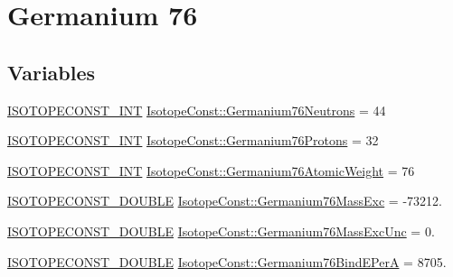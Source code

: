 \hypertarget{group___isotope_const-_germanium-_ge76}{}\section{Germanium 76}
\label{group___isotope_const-_germanium-_ge76}
\subsection*{Variables}
\begin{DoxyCompactItemize}
\item 
\mbox{\hyperlink{group___isotope_const-_macros_ga5f18360b3e99483a35c32d789e62621c}{I\+S\+O\+T\+O\+P\+E\+C\+O\+N\+S\+T\+\_\+\+I\+NT}} \mbox{\hyperlink{group___isotope_const-_germanium-_ge76_ga0f41cf80072dd6011f30625a9f236fae}{Isotope\+Const\+::\+Germanium76\+Neutrons}} = 44
\item 
\mbox{\hyperlink{group___isotope_const-_macros_ga5f18360b3e99483a35c32d789e62621c}{I\+S\+O\+T\+O\+P\+E\+C\+O\+N\+S\+T\+\_\+\+I\+NT}} \mbox{\hyperlink{group___isotope_const-_germanium-_ge76_ga7f76b6003a0a6a6c932be69e5c448bdf}{Isotope\+Const\+::\+Germanium76\+Protons}} = 32
\item 
\mbox{\hyperlink{group___isotope_const-_macros_ga5f18360b3e99483a35c32d789e62621c}{I\+S\+O\+T\+O\+P\+E\+C\+O\+N\+S\+T\+\_\+\+I\+NT}} \mbox{\hyperlink{group___isotope_const-_germanium-_ge76_ga03db19f96e8a8244711a8920a37c2286}{Isotope\+Const\+::\+Germanium76\+Atomic\+Weight}} = 76
\item 
\mbox{\hyperlink{group___isotope_const-_macros_ga8f45a7272ce02c0b4c65c44636ed719a}{I\+S\+O\+T\+O\+P\+E\+C\+O\+N\+S\+T\+\_\+\+D\+O\+U\+B\+LE}} \mbox{\hyperlink{group___isotope_const-_germanium-_ge76_ga38d3ba0dd0d9dd46c1391a6d399b5bb4}{Isotope\+Const\+::\+Germanium76\+Mass\+Exc}} = -\/73212.
\item 
\mbox{\hyperlink{group___isotope_const-_macros_ga8f45a7272ce02c0b4c65c44636ed719a}{I\+S\+O\+T\+O\+P\+E\+C\+O\+N\+S\+T\+\_\+\+D\+O\+U\+B\+LE}} \mbox{\hyperlink{group___isotope_const-_germanium-_ge76_gaca2bd29a9556333a7c83be50de931195}{Isotope\+Const\+::\+Germanium76\+Mass\+Exc\+Unc}} = 0.
\item 
\mbox{\hyperlink{group___isotope_const-_macros_ga8f45a7272ce02c0b4c65c44636ed719a}{I\+S\+O\+T\+O\+P\+E\+C\+O\+N\+S\+T\+\_\+\+D\+O\+U\+B\+LE}} \mbox{\hyperlink{group___isotope_const-_germanium-_ge76_ga752c1cc0e65ad16d19386880fdcb45ba}{Isotope\+Const\+::\+Germanium76\+Bind\+E\+PerA}} = 8705.
\item 

\end{DoxyCompactItemize}

